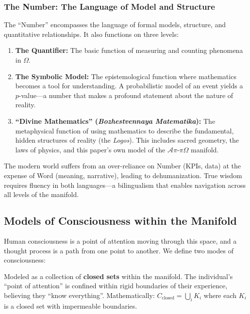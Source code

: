 \documentclass[11pt,a4paper]{article}
\begin{document}
\begin{small}
\subsubsection{The Number: The Language of Model and Structure}
The ``Number'' encompasses the language of formal models, structure, and quantitative relationships. It also functions on three levels:

\begin{enumerate}
    \item \textbf{The Quantifier:} The basic function of measuring and counting phenomena in $\Omega$.
    \item \textbf{The Symbolic Model:} The epistemological function where mathematics becomes a tool for understanding. A probabilistic model of an event yields a $p$-value—a number that makes a profound statement about the nature of reality.
    \item \textbf{``Divine Mathematics'' (\textit{Bozhestvennaya Matematika}):} The metaphysical function of using mathematics to describe the fundamental, hidden structures of reality (the \textit{Logos}). This includes sacred geometry, the laws of physics, and this paper's own model of the $\mathcal{A}\pi\text{-}\pi\Omega$ manifold.
\end{enumerate}

The modern world suffers from an over-reliance on Number (KPIs, data) at the expense of Word (meaning, narrative), leading to dehumanization. True wisdom requires fluency in both languages—a bilingualism that enables navigation across all levels of the manifold.

\subsection{Models of Consciousness within the Manifold}
Human consciousness is a point of attention moving through this space, and a thought process is a path from one point to another. We define two modes of consciousness:

\begin{description}[style=nextline]
    \item[\textbf{Non-Socratic Consciousness}] Modeled as a collection of \textbf{closed sets} within the manifold. The individual's ``point of attention'' is confined within rigid boundaries of their experience, believing they ``know everything''. Mathematically: $C_{\text{closed}} = \bigcup_{i} K_i$ where each $K_i$ is a closed set with impermeable boundaries.
    

\end{description}
\end{small}
\end{document}
